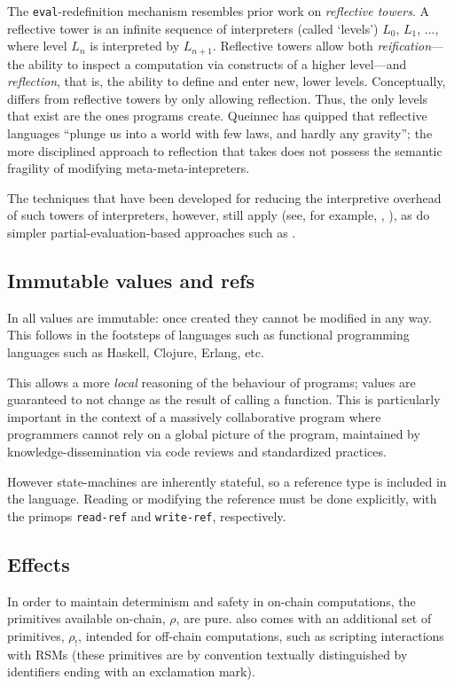 The \texttt{eval}-redefinition mechanism resembles prior work on
\emph{reflective towers}. A reflective tower is an infinite sequence of
interpreters (called `levels') $L_0$, $L_1$, ..., where level $L_n$ is
interpreted by $L_{n+1}$. Reflective towers allow both \emph{reification}---the
ability to inspect a computation via constructs of a higher level---and
\emph{reflection}, that is, the ability to define and enter new, lower levels.
Conceptually, \rad{} differs from reflective towers by only allowing reflection.
Thus, the only levels that exist are the ones programs create. Queinnec has
quipped that reflective languages ``plunge us into a world with few laws, and
hardly any gravity''\cite{Queinnec1994}; the more disciplined approach to
reflection that \rad{} takes does not possess the semantic fragility of modifying
meta-meta-intepreters.

The techniques that have been developed for reducing the interpretive overhead
of such towers of interpreters, however, still
apply (see, for example, \cite{Amin2017}, \cite{Asai2014}), as do simpler
partial-evaluation-based approaches such as \cite{Brown2017}.

\subsection{Immutable values and refs}
In \rad{} all values are immutable: once created they cannot be modified in any
way. This follows in the footsteps of languages such as functional programming
languages such as Haskell, Clojure, Erlang, etc.

This allows a more \textit{local} reasoning of the behaviour of programs;
values are guaranteed to not change as the result of calling a function. This
is particularly important in the context of a massively collaborative
program where programmers cannot rely on a global picture of the program,
maintained by knowledge-dissemination via code reviews and standardized
practices.

However state-machines are inherently stateful, so a reference type is included
in the language. Reading or modifying the reference must be done explicitly,
with the primops \texttt{read-ref} and \texttt{write-ref}, respectively.

\subsection{Effects} In order to maintain determinism and safety in on-chain
computations, the primitives available on-chain, $\rho$, are pure. \rad{} also
comes with an additional set of primitives, $\rho_{!}$, intended for off-chain
computations, such as scripting interactions with RSMs (these primitives are
by convention textually distinguished by identifiers ending with an exclamation
mark).

